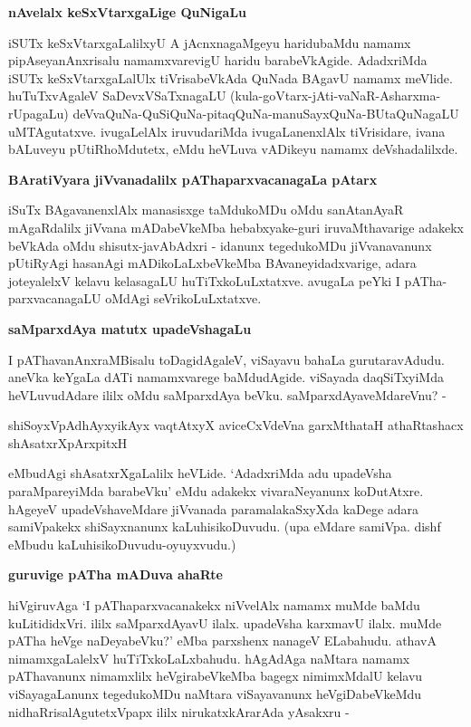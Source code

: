 {\bigskip
\noindent
{\large\bf nAvelalx keSxVtarxgaLige QuNigaLu}}\label{page104}
\medskip

\noindent
iSUTx keSxVtarxgaLalilxyU A jAcnxnagaMgeyu haridubaMdu namamx pipAseyanAnxrisalu namamxvarevigU haridu barabeVkAgide. AdadxriMda iSUTx keSxVtarxgaLalUlx tiVrisabeVkAda QuNada BAgavU namamx meVlide. huTuTx\-vAgaleV SaDevxVSaTxnagaLU (kula-goVtarx-\-jAti-vaNaR-Asharxma-rUpagaLu) deVvaQuNa-QuSiQuNa\--pitaq\-QuNa-manuSayx\break\-QuNa-BUtaQuNagaLU uMTAgutatxve. ivugaLelAlx iruvudariMda ivugaLanenxlAlx tiVrisi\-dare, ivana bALuveyu pUtiRhoMdutetx, eMdu heVLuva vADikeyu \hbox{namamx} deVshadalilxde.

{\bigskip
\noindent
{\large\bf BAratiVyara jiVvanadalilx pAThaparxvacanagaLa pAtarx}}\label{page105}
\medskip

\noindent
iSuTx BAgavanenxlAlx manasisxge taMdukoMDu oMdu sanAtanAyaR mAgaRdalilx jiVvana mADabeV\-keMba hebabxyake-guri iruvaMthavarige adakekx beVkAda oMdu shisutx-javAbAdxri - idanunx tegedukoMDu jiVvana\-vanunx pUtiRyAgi hasanAgi mADikoLaLxbeVkeMba BAvaneyidadxvarige, adara joteyalelxV kelavu kelasa\-gaLU huTiTxkoLuLxtatxve. avugaLa peYki I pATha-parxvacanagaLU oMdAgi seVrikoLuLxtatxve.

{\bigskip
\noindent
{\large\bf saMparxdAya matutx upadeVshagaLu}}\label{page105}
\medskip

\noindent
I pAThavanAnxraMBisalu toDagidAgaleV, viSayavu bahaLa gurutaravAdudu. aneVka keYgaLa dATi namamx\-varege baMdudAgide. viSayada daqSiTxyiMda heVLuvudAdare ililx oMdu saMparxdAya beVku. saMparx\-dAyaveMdareVnu? -

\begin{shloka}
shiSoyxVpAdhAyxyikAyx vaqtAtxyX aviceCxVdeVna garxMthataH athaRtashacx shAsatxrXpArxpitxH\label{105}
\end{shloka}

\noindent
eMbudAgi shAsatxrXgaLalilx heVLide. `AdadxriMda adu upadeVsha paraMpareyiMda barabeVku' eMdu adakekx vivaraNeyanunx koDutAtxre. hAgeyeV upadeVshaveMdare jiVvanada paramalakaSxyXda kaDege adara samiVpakekx shiSayxnanunx kaLuhisikoDuvudu. (upa eMdare samiVpa. dishf eMbudu kaLuhisikoDuvudu\--oyuyx\-vudu.)

{\bigskip
\noindent
{\large\bf guruvige pATha mADuva ahaRte}}\label{page105}
\medskip

\noindent
hiVgiruvAga `I pAThaparxvacanakekx niVvelAlx namamx muMde baMdu kuLitididxVri. ililx saMparxdAyavU ilalx. upadeVsha karxmavU ilalx. muMde pATha heVge naDeyabeVku?' eMba parxshenx nanageV ELabahudu. athavA nimamx\-gaLalelxV huTiTxkoLaLxbahudu. hAgAdAga naMtara namamx pAThavanunx nimamxlilx heVgirabeVkeMba bagegx nimimxM\-dalU kelavu viSayagaLanunx tegedukoMDu naMtara viSayavanunx heVgiDabeVkeMdu nidhaRrisalAgutetxVpapx ililx nirukatxkArarAda yAsakxru -

